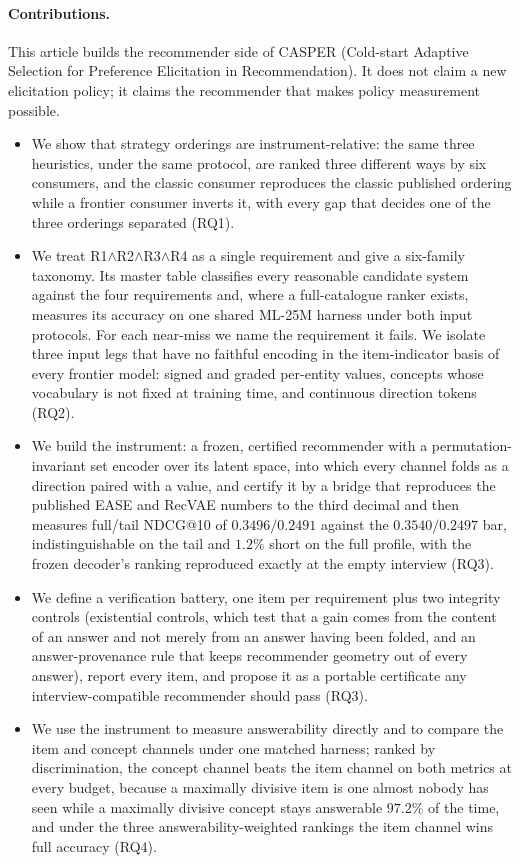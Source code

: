 \documentclass[manuscript,screen,review]{acmart}
\begin{document}
\paragraph{Contributions.} This article builds the recommender side of CASPER (Cold-start Adaptive Selection for Preference Elicitation in Recommendation). It does not claim a new elicitation policy; it claims the recommender that makes policy measurement possible.
\begin{itemize}[leftmargin=1.4em,itemsep=2pt]
  \item We show that strategy orderings are instrument-relative: the same three heuristics, under the same protocol, are ranked three different ways by six consumers, and the classic consumer reproduces the classic published ordering while a frontier consumer inverts it, with every gap that decides one of the three orderings separated (RQ1).
  \item We treat R1$\wedge$R2$\wedge$R3$\wedge$R4 as a single requirement and give a six-family taxonomy. Its master table classifies every reasonable candidate system against the four requirements and, where a full-catalogue ranker exists, measures its accuracy on one shared ML-25M harness under both input protocols. For each near-miss we name the requirement it fails. We isolate three input legs that have no faithful encoding in the item-indicator basis of every frontier model: signed and graded per-entity values, concepts whose vocabulary is not fixed at training time, and continuous direction tokens (RQ2).
  \item We build the instrument: a frozen, certified recommender with a permutation-invariant set encoder over its latent space, into which every channel folds as a direction paired with a value, and certify it by a bridge that reproduces the published EASE and RecVAE numbers to the third decimal and then measures full/tail NDCG@10 of $0.3496/0.2491$ against the $0.3540/0.2497$ bar, indistinguishable on the tail and $1.2\%$ short on the full profile, with the frozen decoder's ranking reproduced exactly at the empty interview (RQ3).
  \item We define a verification battery, one item per requirement plus two integrity controls (existential controls, which test that a gain comes from the content of an answer and not merely from an answer having been folded, and an answer-provenance rule that keeps recommender geometry out of every answer), report every item, and propose it as a portable certificate any interview-compatible recommender should pass (RQ3).
  \item We use the instrument to measure answerability directly and to compare the item and concept channels under one matched harness; ranked by discrimination, the concept channel beats the item channel on both metrics at every budget, because a maximally divisive item is one almost nobody has seen while a maximally divisive concept stays answerable $97.2\%$ of the time, and under the three answerability-weighted rankings the item channel wins full accuracy (RQ4).
\end{itemize}
\end{document}
